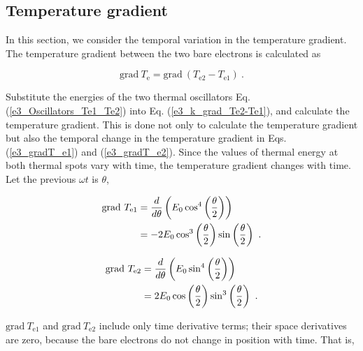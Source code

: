 \documentclass[%
 reprint,
 amsmath,amssymb,
 aps,
]{revtex4-1}
\numberwithin{equation}{section}
\begin{document}
\subsection{Temperature gradient}
\label{Temperature_gradient}

    In this section, we consider the temporal variation in the temperature gradient. The temperature gradient between the two bare electrons is calculated as

        \begin{equation}
            \mathrm{grad} \ T_{\mathrm{e}} = \mathrm{grad} \ (T_{\mathrm{e2}} - T_{\mathrm{e1}})
            \ .
             \label{e3_k_grad_Te2-Te1}
        \end{equation}

    Substitute the energies of the two thermal oscillators Eq. (\ref{e3_Oscillators_Te1_Te2}) into Eq. (\ref{e3_k_grad_Te2-Te1}), and calculate the temperature gradient. This is done not only to calculate the temperature gradient but also the temporal change in the temperature gradient in Eqs. (\ref{e3_gradT_e1}) and (\ref{e3_gradT_e2}). Since the values of thermal energy at both thermal spots vary with time, the temperature gradient changes with time. Let the previous $\omega t$ is $\theta$,

        \begin{align}
            \mathrm{grad} \ T_{\mathrm{e1}}
                &= \frac{d}{d \theta} \left( E_{0} \cos^{4} \left( \frac{\theta}{2} \right) \right) \notag \\
                &= - 2 E_{0} \cos^{3} \left( \frac{\theta}{2} \right) \sin \left( \frac{\theta}{2} \right)
                \ .
                \label{e3_gradT_e1}
        \end{align}

        \begin{align}
            \mathrm{grad} \ T_{\mathrm{e2}}
                &= \frac{d}{d \theta} \left( E_{0} \sin^{4} \left( \frac{\theta}{2} \right) \right) \notag \\
                &=   2 E_{0} \cos \left( \frac{\theta}{2} \right) \sin^{3} \left( \frac{\theta}{2} \right)
                \ .
                \label{e3_gradT_e2}
        \end{align}

    $\mathrm{grad} \ T_{\mathrm{e1}}$ and $\mathrm{grad} \ T_{\mathrm{e2}}$ include only time derivative terms; their space derivatives are zero, because the bare electrons do not change in position with time. That is,
\end{document}
